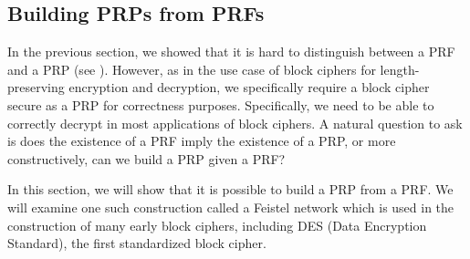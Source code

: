 \subsection{Building PRPs from PRFs}
In the previous section, we showed that it is hard to distinguish between a PRF and a PRP (see ).
However, as in the use case of block ciphers for length-preserving encryption and decryption, we specifically require a block cipher secure as a PRP for correctness purposes.
Specifically, we need to be able to correctly decrypt in most applications of block ciphers.
A natural question to ask is does the existence of a PRF imply the existence of a PRP, or more constructively, can we build a PRP given a PRF?

In this section, we will show that it is possible to build a PRP from a PRF.
We will examine one such construction called a Feistel network which is used in the construction of many early block ciphers, including DES (Data Encryption Standard), the first standardized block cipher.

